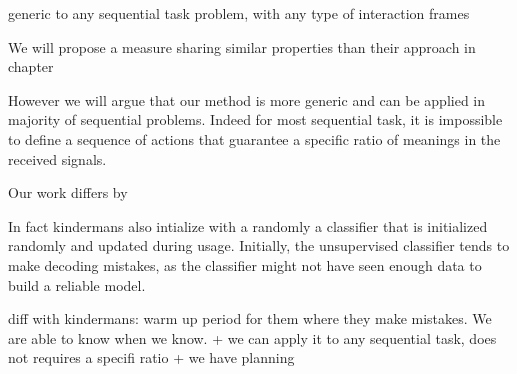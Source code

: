 
generic to any sequential task problem, with any type of interaction frames


We will propose a measure sharing similar properties than their approach in chapter

However we will argue that our method is more generic and can be applied in majority of sequential problems. Indeed for most sequential task, it is impossible to define a sequence of actions that guarantee a specific ratio of meanings in the received signals. 


Our work differs by

In fact kindermans also intialize with a randomly a classifier
that is initialized randomly and updated during usage. Initially, the unsupervised classifier tends to make decoding mistakes, as the classifier might not have seen enough data to build a reliable model.

diff with kindermans: warm up period for them where they make mistakes. We are able to know when we know. + we can apply it to any sequential task, does not requires a specifi ratio + we have planning


